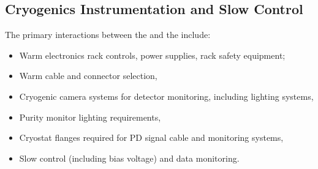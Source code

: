 

\subsection{Cryogenics Instrumentation and Slow Control}
\label{sec:fdsp-pd-intfc-xeon}

The primary interactions between the  and the  include:

\begin{itemize}
    \item Warm electronics rack controls, power supplies, rack safety equipment;
    \item Warm cable and connector selection,
    \item Cryogenic camera systems for detector monitoring, including lighting systems,
    \item Purity monitor lighting requirements,
    \item Cryostat flanges required for PD signal cable and monitoring systems,
    \item {} Slow control (including bias voltage) and data monitoring.
\end{itemize}

